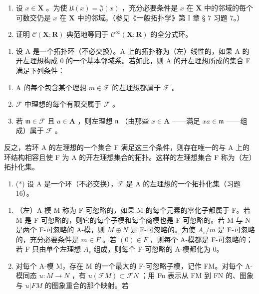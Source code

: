 \begin{enumerate}
\item
  设 \(x \in \mathbf{X}\) 。为使 \(\mathfrak{U}(x) = \mathfrak{J}(x)\) ，充分必要条件是 \(x\) 在 \(\mathbf{X}\) 中的邻域的每个可数交仍是 \(x\) 在 \(\mathbf{X}\) 中的邻域。（参见《一般拓扑学》第 I 章 § 7 习题 7。）
\item
  证明 \(\mathcal{C}(\mathbf{X};\mathbf{R})\) 典范地等同于 \(\mathcal{C}^{\infty}(\mathbf{X};\mathbf{R})\) 的全分式环。
\end{enumerate}

\begin{enumerate}
\def\labelenumi{\arabic{enumi}.}
\setcounter{enumi}{15}
\tightlist
\item
  设 A 是一个拓扑环（不必交换）。A 上的拓扑称为（左）线性的，如果 A 的开左理想构成 0 的一个基本邻域系。若如此，则 A 的开左理想所成的集合 F 满足下列条件：
\end{enumerate}

\begin{enumerate}
\def\labelenumi{(\arabic{enumi})}
\item
  A 的每个包含某个理想 \(m \in \mathcal{F}\) 的左理想都属于 \(\mathcal{F}\) 。
\item
  \(\mathcal{F}\) 中理想的每个有限交属于 \(\mathcal{F}\) 。
\item
  若 \(\mathfrak{m} \in \mathcal{F}\) 且 \(a \in \mathbf{A}\) ，则左理想 \(\mathfrak{n}\) （由那些 \(x \in \mathbf{A}\) ——满足 \(xa \in \mathfrak{m}\) ——组成）属于 \(\mathcal{F}\) 。
\end{enumerate}

反之，若环 A 的左理想的一个集合 F 满足这三个条件，则存在唯一的与 A 上的环结构相容且使 F 为 A 的开左理想集合的拓扑。这样的左理想集合 F 称为（左）拓扑化集。

\begin{enumerate}
\def\labelenumi{\arabic{enumi}.}
\setcounter{enumi}{16}
\tightlist
\item
  (*) 设 A 是一个环（不必交换），\(\mathcal{F}\) 是 A 的左理想的一个拓扑化集（习题 16）。
\end{enumerate}

\begin{enumerate}
\def\labelenumi{(\alph{enumi})}
\item
  （左）A-模 M 称为 F-可忽略的，如果 M 的每个元素的零化子都属于 F。若 M 是 F-可忽略的，则它的每个子模和每个商模也是 F-可忽略的。若 M 与 N 是两个 F-可忽略的 A-模，则 \(M \oplus N\) 是 F-可忽略的。为使 \(A_{s}/m\) 是 F-可忽略的，充分必要条件是 \(m \in F\) 。若 \((0) \in F\) ，则每个 A-模都是 F-可忽略的；若 F 只由单个左理想 \(A_{s}\) 组成，则每个 F-可忽略的 A-模都化为 0。
\item
  对每个 A-模 M，存在 M 的一个最大的 F-可忽略子模，记作 FM。对每个 A-模同态 \(u: M \to N\) ，有 \(u(\mathcal{F}M) \subset \mathcal{F}N\) ；用 Fu 表示从 FM 到 FN 的、图象与 \(u|FM\) 的图象重合的那个映射。若
\end{enumerate}

